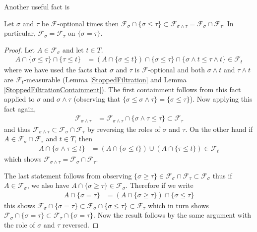 Another useful fact is 
\begin{prop}\label{StoppedAlgebraMinOfOptionalTimes}Let $\sigma$ and $\tau$ be $\mathcal{F}$-optional times
  then $\mathcal{F}_\sigma \cap \lbrace \sigma \leq \tau \rbrace \subset
  \mathcal{F}_{\sigma \wedge \tau} = \mathcal{F}_\sigma \cap
  \mathcal{F}_\tau$.  In particular, $\mathcal{F}_\sigma = \mathcal{F}_\tau$ on $\lbrace \sigma = \tau \rbrace$.
\end{prop}
\begin{proof}
Let $A \in \mathcal{F}_\sigma$ and let $t \in T$.
\begin{align*}
A \cap \lbrace \sigma \leq \tau \rbrace \cap \lbrace \tau \leq t \rbrace 
&=(A \cap \lbrace \sigma \leq t \rbrace) \cap \lbrace \sigma \leq \tau \rbrace 
\cap \lbrace \sigma \wedge t \leq \tau \wedge t \rbrace
\in \mathcal{F}_t
\end{align*}
where we have used the facts that $\sigma$ and $\tau$ is $\mathcal{F}$-optional and both $\sigma \wedge t$ and $\tau \wedge t$ are $\mathcal{F}_t$-measurable (Lemma \ref{StoppedFiltration} and Lemma \ref{StoppedFiltrationContainment}).  The first containment follows from this fact applied to $\sigma$ and $\sigma \wedge \tau$ (observing that $\lbrace \sigma \leq \sigma \wedge \tau \rbrace = \lbrace \sigma \leq \tau \rbrace$).  Now applying this fact again,
\begin{align*}
\mathcal{F}_{\sigma \wedge \tau}  &=\mathcal{F}_{\sigma \wedge \tau} \cap \lbrace \sigma \wedge \tau \leq \tau \rbrace \subset \mathcal{F}_\tau
\end{align*}
and thus $\mathcal{F}_{\sigma \wedge \tau} \subset \mathcal{F}_\sigma \cap \mathcal{F}_\tau$ by reversing the roles of $\sigma$ and $\tau$.  On the other hand if
$A \in \mathcal{F}_\sigma \cap \mathcal{F}_\tau$ and $t \in T$, then
\begin{align*}
A \cap \lbrace \sigma \wedge \tau \leq t \rbrace
&=(A \cap \lbrace \sigma \leq t \rbrace) \cup (A \cap \lbrace \tau \leq t \rbrace)
\in \mathcal{F}_t
\end{align*}
which shows $\mathcal{F}_{\sigma \wedge \tau} = \mathcal{F}_\sigma \cap \mathcal{F}_\tau$.

The last statement follows from observing $\lbrace \sigma \geq \tau \rbrace \in \mathcal{F}_\sigma \cap \mathcal{F}_\tau \subset \mathcal{F}_\sigma$ thus if $A \in \mathcal{F}_\sigma$, we also have
$A  \cap \lbrace \sigma \geq \tau \rbrace\in \mathcal{F}_\sigma$.  Therefore if we write
\begin{align*}
A \cap \lbrace \sigma = \tau \rbrace  &=  (A \cap \lbrace \sigma \geq  \tau \rbrace) \cap  \lbrace \sigma \leq  \tau \rbrace
\end{align*}
this shows $\mathcal{F}_\sigma \cap \lbrace \sigma = \tau \rbrace \subset \mathcal{F}_\sigma \cap \lbrace \sigma \leq \tau \rbrace \subset \mathcal{F}_\tau$ which
in turn shows $\mathcal{F}_\sigma \cap \lbrace \sigma = \tau \rbrace \subset \mathcal{F}_\tau \cap \lbrace \sigma = \tau \rbrace$.  Now the result follows by the same argument with the role of $\sigma$ and $\tau$ reversed.
\end{proof}

